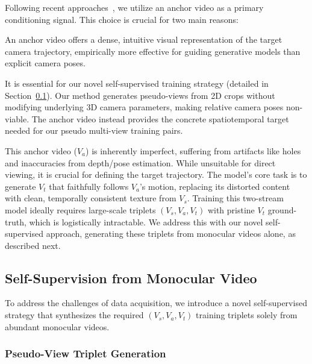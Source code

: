 Following recent approaches~\cite{yu2025trajectorycrafter,ex4d,jeong2025reangle,bai2024syncammaster,wang2025epic}, we utilize an anchor video as a primary conditioning signal. This choice is crucial for two main reasons:
\begin{description}[noitemsep, topsep=0pt, partopsep=0pt, leftmargin=0pt, style=unboxed, font=\normalfont\bfseries]
    \item [Intuitive Visual Guidance:] An anchor video offers a dense, intuitive visual representation of the target camera trajectory, empirically more effective for guiding generative models than explicit camera poses.
    \item [Self-Supervised Training Necessity:] It is essential for our novel self-supervised training strategy (detailed in Section~\ref{sec:self_supervision}). Our method generates pseudo-views from 2D crops without modifying underlying 3D camera parameters, making relative camera poses non-viable. The anchor video instead provides the concrete spatiotemporal target needed for our pseudo multi-view training pairs.
\end{description}

This anchor video ($V_a$) is inherently imperfect, suffering from artifacts like holes and inaccuracies from depth/pose estimation. While unsuitable for direct viewing, it is crucial for defining the target trajectory. The model's core task is to generate $V_{t}$ that faithfully follows $V_{a}$'s motion, replacing its distorted content with clean, temporally consistent texture from $V_{s}$. Training this two-stream model ideally requires large-scale triplets $(V_{s}, V_{a}, V_{t})$ with pristine $V_t$ ground-truth, which is logistically intractable. We address this with our novel self-supervised approach, generating these triplets from monocular videos alone, as described next.

\subsection{Self-Supervision from Monocular Video}
\label{sec:self_supervision}

To address the challenges of data acquisition, we introduce a novel self-supervised strategy that synthesizes the required $(V_s, V_a, V_t)$ training triplets solely from abundant monocular videos.

\subsubsection{Pseudo-View Triplet Generation}
\label{sec:pseudo_view_triplet}

